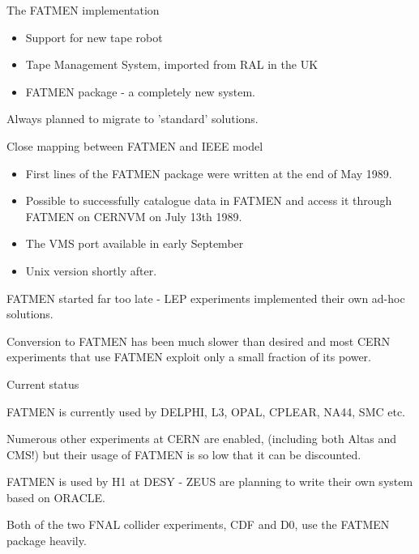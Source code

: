 \begin{slide}
\begin{center}The FATMEN implementation\end{center}

\begin{itemize}
\item
Support for new tape robot
\item
Tape Management System, imported from RAL in the UK
\item
FATMEN package - a completely new system.
\end{itemize}

Always planned to migrate to 'standard' solutions.

Close mapping between FATMEN and IEEE model
\end{slide}

\begin{slide}
\begin{itemize}
\item
First lines of the FATMEN
package were written at the end of May 1989. 
\item
Possible to successfully catalogue data in FATMEN
and access it through FATMEN on CERNVM 
on July 13th 1989. 
\item
The VMS port available in early
September 
\item
Unix version shortly after.
\end{itemize}

\end{slide}

\begin{slide}
FATMEN started far too late - LEP experiments
implemented their own ad-hoc solutions.

Conversion to FATMEN has been much slower
than desired and most CERN experiments that use FATMEN
exploit only a small fraction of its power.

\end{slide}

\begin{slide}
\begin{center}Current status\end{center}

FATMEN is currently used by DELPHI, L3, OPAL, 
CPLEAR, NA44, SMC etc.

Numerous other experiments at CERN are enabled, (including both
Altas and CMS!) but their usage of FATMEN is so low that it can
be discounted.

FATMEN is used by H1 at DESY - ZEUS are planning to write their
own system based on ORACLE.

Both of the two FNAL collider experiments, CDF and D0, use
the FATMEN package heavily. 

\end{slide}

